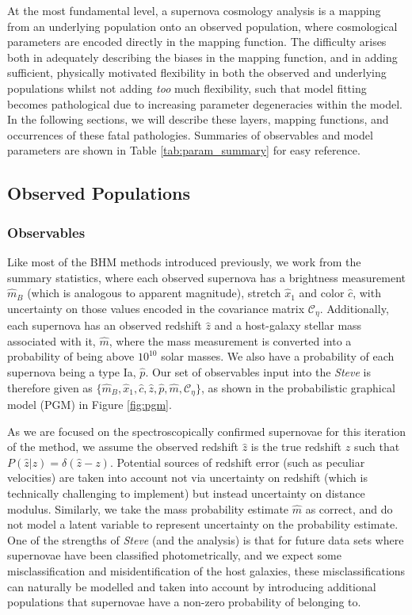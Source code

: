 \documentclass[a4paper,fleqn,usenatbib]{emulateapj}
\newcommand{\cov}{\mathcal{C}_\eta}
\newcommand{\steve}{\textit{Steve}}
\newcommand{\rubin}{\citetalias{Rubin2015}}
\begin{document}
At the most fundamental level, a supernova cosmology analysis is a mapping from an underlying population onto an observed population, where cosmological parameters are encoded directly in the mapping function. The difficulty arises both in adequately describing the biases in the mapping function, and in adding sufficient, physically motivated flexibility in both the observed and underlying populations whilst not adding \textit{too} much flexibility, such that model fitting becomes pathological due to increasing parameter degeneracies within the model. In the following sections, we will describe these layers, mapping functions, and occurrences of these fatal pathologies. Summaries of observables and model parameters are shown in Table \ref{tab:param_summary} for easy reference.


\subsection{Observed Populations}

\subsubsection{Observables}
Like most of the BHM methods introduced previously, we work from the summary statistics, where each observed supernova has a brightness measurement $\hat{m}_B$ (which is analogous to apparent magnitude), stretch $\hat{x}_1$ and color $\hat{c}$, with uncertainty on those values encoded in the covariance matrix $\cov$. Additionally, each supernova has an observed redshift $\hat{z}$ and a host-galaxy stellar mass associated with it, $\hat{m}$, where the mass measurement is converted into a probability of being above $10^{10}$ solar masses. We also have a probability of each supernova being a type Ia, $\hat{p}$. Our set of observables input into the {\steve} is therefore given as $\lbrace \hat{m}_B, \hat{x}_1, \hat{c}, \hat{z}, \hat{p}, \hat{m}, \cov \rbrace$, as shown in the probabilistic graphical model (PGM) in Figure \ref{fig:pgm}.


As we are focused on the spectroscopically confirmed supernovae for this iteration of the method, we assume the observed redshift $\hat{z}$ is the true redshift $z$ such that $P(\hat{z}|z) = \delta(\hat{z} - z)$. Potential sources of redshift error (such as peculiar velocities) are taken into account not via uncertainty on redshift (which is technically challenging to implement) but instead uncertainty on distance modulus. Similarly, we take the mass probability estimate $\hat{m}$ as correct, and do not model a latent variable to represent uncertainty on the probability estimate. One of the strengths of {\steve} (and the {\rubin} analysis) is that for future data sets where supernovae have been classified photometrically, and we expect some misclassification and misidentification of the host galaxies, these misclassifications can naturally be modelled and taken into account by introducing additional populations that supernovae have a non-zero probability of belonging to.
\end{document}

